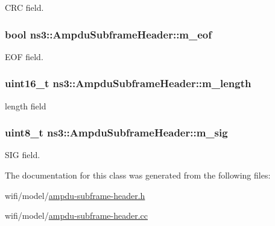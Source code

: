 C\+RC field. 

\subsubsection[{\texorpdfstring{m\+\_\+eof}{m_eof}}]{\setlength{\rightskip}{0pt plus 5cm}bool ns3\+::\+Ampdu\+Subframe\+Header\+::m\+\_\+eof\hspace{0.3cm}{\ttfamily [private]}}\hypertarget{classns3_1_1AmpduSubframeHeader_a6f1a3cb3b7f5f703862c4a1f4b7250c0}{}\label{classns3_1_1AmpduSubframeHeader_a6f1a3cb3b7f5f703862c4a1f4b7250c0}


E\+OF field. 

\subsubsection[{\texorpdfstring{m\+\_\+length}{m_length}}]{\setlength{\rightskip}{0pt plus 5cm}uint16\+\_\+t ns3\+::\+Ampdu\+Subframe\+Header\+::m\+\_\+length\hspace{0.3cm}{\ttfamily [private]}}\hypertarget{classns3_1_1AmpduSubframeHeader_a0d4b7c0bd30ccbb940cfa58361474776}{}\label{classns3_1_1AmpduSubframeHeader_a0d4b7c0bd30ccbb940cfa58361474776}


length field 

\subsubsection[{\texorpdfstring{m\+\_\+sig}{m_sig}}]{\setlength{\rightskip}{0pt plus 5cm}uint8\+\_\+t ns3\+::\+Ampdu\+Subframe\+Header\+::m\+\_\+sig\hspace{0.3cm}{\ttfamily [private]}}\hypertarget{classns3_1_1AmpduSubframeHeader_acec22aad5424bff633f1dc7da9661d7b}{}\label{classns3_1_1AmpduSubframeHeader_acec22aad5424bff633f1dc7da9661d7b}


S\+IG field. 



The documentation for this class was generated from the following files\+:\begin{DoxyCompactItemize}
\item 
wifi/model/\hyperlink{ampdu-subframe-header_8h}{ampdu-\/subframe-\/header.\+h}\item 
wifi/model/\hyperlink{ampdu-subframe-header_8cc}{ampdu-\/subframe-\/header.\+cc}\end{DoxyCompactItemize}
